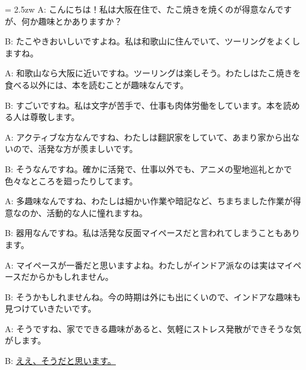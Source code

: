 \documentclass[11pt]{amsart}
\title{}
\author{}
\newenvironment{hangall}[1]{\hangindent = 2.5zw\everypar{\hangindent = 2.5zw}}{}
\begin{document}
\maketitle
\begin{hangall}{}%
A: こんにちは！私は大阪在住で、たこ焼きを焼くのが得意なんですが、何か趣味とかありますか？

B: たこやきおいしいですよね。私は和歌山に住んでいて、ツーリングをよくしますね。

A: 和歌山なら大阪に近いですね。ツーリングは楽しそう。わたしはたこ焼きを食べる以外には、本を読むことが趣味なんです。

B: すごいですね。私は文字が苦手で、仕事も肉体労働をしています。本を読める人は尊敬します。

A: アクティブな方なんですね、わたしは翻訳家をしていて、あまり家から出ないので、活発な方が羨ましいです。

B: そうなんですね。確かに活発で、仕事以外でも、アニメの聖地巡礼とかで色々なところを廻ったりしてます。

A: 多趣味なんですね、わたしは細かい作業や暗記など、ちまちました作業が得意なのか、活動的な人に憧れますね。

B: 器用なんですね。私は活発な反面マイペースだと言われてしまうこともあります。

A: マイペースが一番だと思いますよね。わたしがインドア派なのは実はマイペースだからかもしれません。

B: そうかもしれませんね。今の時期は外にも出にくいので、インドアな趣味も見つけていきたいです。

A: そうですね、家でできる趣味があると、気軽にストレス発散ができそうな気がします。

B: \ul{ええ、そうだと思います。}\end{hangall}
\end{document}

